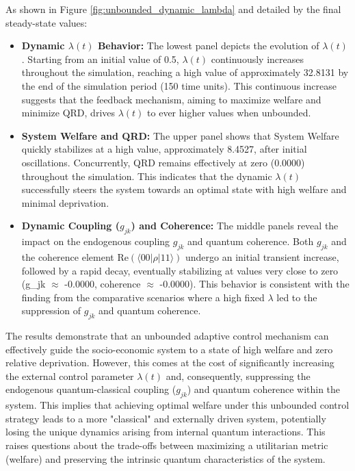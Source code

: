 \documentclass[9pt]{article}
\begin{document}
As shown in Figure \ref{fig:unbounded_dynamic_lambda} and detailed by the final steady-state values:
\begin{itemize}
    \item \textbf{Dynamic $\lambda(t)$ Behavior:} The lowest panel depicts the evolution of $\lambda(t)$. Starting from an initial value of 0.5, $\lambda(t)$ continuously increases throughout the simulation, reaching a high value of approximately 32.8131 by the end of the simulation period (150 time units). This continuous increase suggests that the feedback mechanism, aiming to maximize welfare and minimize QRD, drives $\lambda(t)$ to ever higher values when unbounded.
    \item \textbf{System Welfare and QRD:} The upper panel shows that System Welfare quickly stabilizes at a high value, approximately 8.4527, after initial oscillations. Concurrently, QRD remains effectively at zero (0.0000) throughout the simulation. This indicates that the dynamic $\lambda(t)$ successfully steers the system towards an optimal state with high welfare and minimal deprivation.
    \item \textbf{Dynamic Coupling ($g_{jk}$) and Coherence:} The middle panels reveal the impact on the endogenous coupling $g_{jk}$ and quantum coherence. Both $g_{jk}$ and the coherence element $\text{Re}(\langle 00|\rho|11\rangle)$ undergo an initial transient increase, followed by a rapid decay, eventually stabilizing at values very close to zero (g\_jk $\approx$ -0.0000, coherence $\approx$ -0.0000). This behavior is consistent with the finding from the comparative scenarios where a high fixed $\lambda$ led to the suppression of $g_{jk}$ and quantum coherence.
\end{itemize}

The results demonstrate that an unbounded adaptive control mechanism can effectively guide the socio-economic system to a state of high welfare and zero relative deprivation. However, this comes at the cost of significantly increasing the external control parameter $\lambda(t)$ and, consequently, suppressing the endogenous quantum-classical coupling ($g_{jk}$) and quantum coherence within the system. This implies that achieving optimal welfare under this unbounded control strategy leads to a more "classical" and externally driven system, potentially losing the unique dynamics arising from internal quantum interactions. This raises questions about the trade-offs between maximizing a utilitarian metric (welfare) and preserving the intrinsic quantum characteristics of the system.
\end{document}

